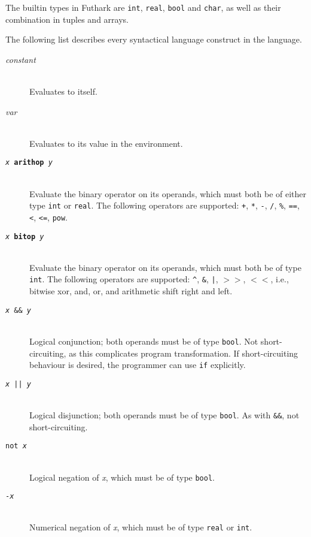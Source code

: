 \documentclass[oneside]{memoir}
\newcommand\boolt[0]{\texttt{bool}}
\newcommand\realt[0]{\texttt{real}}
\newcommand\chart[0]{\texttt{char}}
\newcommand\intt[0]{\texttt{int}}
\begin{document}
The builtin types in Futhark are \intt{}, \realt{}, \boolt{} and \chart{}, as
well as their combination in tuples and arrays.

The following list describes every syntactical language construct in
the language.

\begin{description}
  \item[\textit{constant}]\hfill\\
    Evaluates to itself.

  \item[\textit{var}]\hfill\\
    Evaluates to its value in the environment.

  \item[\texttt{\textit{x} \textbf{arithop} \textit{y}}] \hfill\\
    Evaluate the binary operator on its operands, which must both be
    of either type \intt{} or \realt.  The following operators are
    supported: \texttt{+}, \texttt{*}, \texttt{-}, \texttt{/},
    \texttt{\%}, \texttt{==}, \texttt{<}, \texttt{<=}, \texttt{pow}.

  \item[\texttt{\textit{x} \textbf{bitop} \textit{y}}] \hfill\\
    Evaluate the binary operator on its operands, which must both be
    of type \intt.  The following operators are supported:
    \texttt{\^}, \texttt{\&}, \texttt{|}, \texttt{$>>$}, \texttt{$<<$},
    i.e., bitwise xor, and, or, and arithmetic shift right and left.

  \item[\texttt{\textit{x} \&\& \textit{y}}]\hfill\\
    Logical conjunction; both operands must be of type \boolt.  Not
    short-circuiting, as this complicates program transformation.  If
    short-circuiting behaviour is desired, the programmer can use
    \texttt{if} explicitly.

  \item[\texttt{\textit{x} || \textit{y}}]\hfill\\
    Logical disjunction; both operands must be of type \boolt.  As
    with \texttt{\&\&}, not short-circuiting.

  \item[\texttt{not \textit{x}}]\hfill\\
    Logical negation of \textit{x}, which must be of type \boolt.

  \item[\texttt{-\textit{x}}]\hfill\\
    Numerical negation of \textit{x}, which must be of type \realt{} or \intt.


\end{description}
\end{document}
